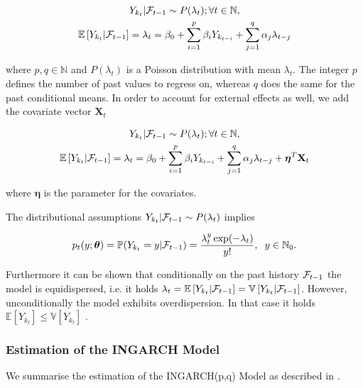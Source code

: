 \begin{gather}
\label{eq:Ingarch model}
Y_{k_t} | \mathcal{F}_{t-1} \sim P(\lambda_t); \forall t \in \mathbb{N}, \\
\mathbb{E}\left[Y_{k_t} | \mathcal{F}_{t-1} \right] = \lambda_t = \beta_0 + \sum_{i=1}^p\beta_i Y_{k_{t-i}} + \sum_{j=1}^q\alpha_j \lambda_{t-j}
\end{gather}

where $p,q \in \mathbb{N}$ and $P(\lambda_t)$ is a Poisson distribution with mean $\lambda_t$. The integer $p$ defines the number of past values to regress on, whereas $q$ does the same for the past conditional means. In order to account for external effects as well, we add the covariate vector $\textbf{X}_t$

\begin{gather}
\label{eq:Ingarch model with external effect}
Y_{k_t} | \mathcal{F}_{t-1} \sim P(\lambda_t); \forall t \in \mathbb{N}, \\
\mathbb{E}\left[Y_{k_t} | \mathcal{F}_{t-1} \right] = \lambda_t = \beta_0 + \sum_{i=1}^p\beta_i Y_{k_{t-i}} + \sum_{j=1}^q\alpha_j \lambda_{t-j} + \bm{\eta}^T\textbf{X}_t
\end{gather}

where $\bm{\eta}$ is the parameter for the covariates. 

The distributional assumptions $Y_{k_t} | \mathcal{F}_{t-1} \sim P(\lambda_t)$ implies 

\begin{equation}
p_t(y;\bm{\theta})=\mathbb{P}(Y_{k_t}=y | \mathcal{F}_{t-1}) = \frac{\lambda_t^y \exp(-\lambda_t)}{y!}, \hspace{0.2cm} y \in \mathbb{N}_0.
\label{eq:Ingarch Distribution}
\end{equation}

Furthermore it can be shown that conditionally on the past history $\mathcal{F}_{t-1}$ the model is equidispersed, i.e. it holds $\lambda_t = \mathbb{E}\left[Y_{k_t} | \mathcal{F}_{t-1}\right] = \mathbb{V}\left[Y_{k_t} | \mathcal{F}_{t-1}\right]$. However, unconditionally the model exhibits overdispersion. In that case it holds $\mathbb{E}\left[Y_{k_t}\right] \leq \mathbb{V}\left[Y_{k_t}\right] $ \cite{Heinen:2003}. 

\subsubsection{Estimation of the INGARCH Model}
\label{sec: Estimation of the Ingarch Model}

We summarise the estimation of the INGARCH(p,q) Model as described in \cite{Liboschik:2016}.

